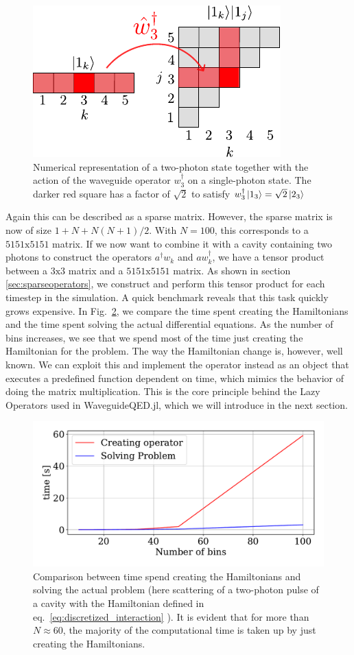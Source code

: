\begin{figure}[H]
    \centering
    \includegraphics[width=0.6 \linewidth]{figures/twophoton.pdf}
    \caption{Numerical representation of a two-photon state together with the action of the waveguide operator $w_3^\dagger$ on a single-photon state. The darker red square has a factor of $\sqrt{2}$ to satisfy $w_3^\dagger \ket{1_3} = \sqrt{2} \ket{2_3}$ }
    \label{fig:twophoton_representation}
\end{figure}


Again this can be described as a sparse matrix. However, the sparse matrix is now of size $1+N+N(N+1)/2$. With $N=100$, this corresponds to a $5151 \mathrm{x} 5151$ matrix. If we now want to combine it with a cavity containing two photons to construct the operators $a^\dagger w_k$ and $a w_k^\dagger$, we have a tensor product between a $3\mathrm{x}3$ matrix and a $5151\mathrm{x}5151$ matrix. As shown in section \ref{sec:sparseoperators}, we construct and perform this tensor product for each timestep in the simulation. A quick benchmark reveals that this task quickly grows expensive. In Fig.~\ref{fig:createoperator_bench}, we compare the time spent creating the Hamiltonians and the time spent solving the actual differential equations. As the number of bins increases, we see that we spend most of the time just creating the Hamiltonian for the problem. The way the Hamiltonian change is, however, well known. We can exploit this and implement the operator instead as an object that executes a predefined function dependent on time, which mimics the behavior of doing the matrix multiplication. This is the core principle behind the Lazy Operators used in WaveguideQED.jl, which we will introduce in the next section. 


\begin{figure}[H]
    \centering
    \includegraphics[width = 0.6 \linewidth]{figures/allocatingvssolving_bench.pdf}
    \caption{Comparison between time spend creating the Hamiltonians and solving the actual problem (here scattering of a two-photon pulse of a cavity with the Hamiltonian defined in eq.~\eqref{eq:discretized_interaction} ). It is evident that for more than $N\approx 60$, the majority of the computational time is taken up by just creating the Hamiltonians.}
    \label{fig:createoperator_bench}
\end{figure}


